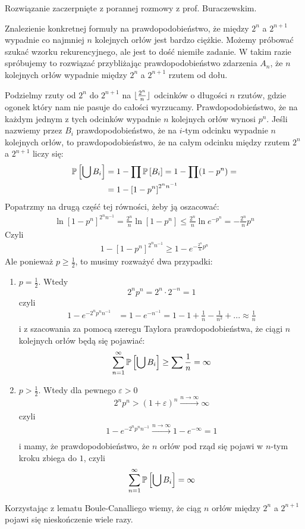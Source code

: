 \documentclass{article}
\begin{document}
Rozwiązanie zaczerpnięte z porannej rozmowy z prof. Buraczewskim.

Znalezienie konkretnej formuły na prawdopodobieństwo, że między $2^n$ a $2^{n+1}$ wypadnie co najmniej $n$ kolejnych orłów jest bardzo ciężkie. Możemy próbować szukać wzorku rekurencyjnego, ale jest to dość niemiłe zadanie. W takim razie spróbujemy to rozwiązać przybliżając prawdopodobieństwo zdarzenia $A_n$, że $n$ kolejnych orłów wypadnie między $2^n$ a $2^{n+1}$ rzutem od dołu.

Podzielmy rzuty od $2^n$ do $2^{n+1}$ na $\lfloor{2^n\over n}\rfloor$ odcinków o długości $n$ rzutów, gdzie ogonek który nam nie pasuje do całości wyrzucamy.
Prawdopodobieństwo, że na każdym jednym z tych odcinków wypadnie $n$ kolejnych orłów wynosi $p^n$. Jeśli nazwiemy przez $B_i$ prawdopodobieństwo, że na $i$-tym odcinku wypadnie $n$ kolejnych orłów, to prawdopodobieństwo, że na całym odcinku między rzutem $2^n$ a $2^{n+1}$ liczy się:
\begin{align*}
  \mathbb{P}\left[\bigcup B_i\right]&=1-\prod\mathbb{P}\left[B_i\right]=1-\prod(1-p^n)=\\
  &=1-\left[1-p^n\right]^{2^nn^{-1}}
\end{align*}
Popatrzmy na drugą część tej równości, żeby ją oszacować:
\begin{align*}
  \ln\left[1-p^n\right]^{2^nn^{-1}}=\frac{2^n}{n}\ln\left[1-p^n\right]\leq\frac{2^n}{n}\ln e^{-p^n}=-\frac{2^n}{n}p^n
\end{align*}
Czyli
\begin{align*}
  1-\left[1-p^n\right]^{2^nn^{-1}}\geq1-e^{-\frac{2^n}{n}p^n}
\end{align*}
Ale ponieważ $p\geq\frac12$, to musimy rozważyć dwa przypadki:
\begin{enumerate}
\item $p=\frac12$. Wtedy
$$2^np^n=2^n\cdot 2^{-n}=1$$
czyli
\begin{align*}
1-e^{-2^np^nn^{-1}}&= 1-e^{-n^{-1}}=1-1+\frac1n-\frac1{n^2}+...\approx\frac1n
\end{align*}
i z szacowania za pomocą szeregu Taylora prawdopodobieństwa, że ciągi $n$ kolejnych orłów będą się pojawiać:
$$\sum\limits_{n=1}^\infty\mathbb{P}\left[\bigcup B_i\right]\geq\sum\frac1n=\infty$$
\item $p>\frac12$. Wtedy dla pewnego $\varepsilon>0$
$$2^np^n>(1+\varepsilon)^n\xrightarrow[]{n\to\infty}\infty$$
czyli
\begin{align*}
1-e^{-2^np^nn^{-1}}\xrightarrow[]{n\to\infty}1-e^{-\infty}=1
\end{align*}
i mamy, że prawdopodobieństwo, że $n$ orłów pod rząd się pojawi w $n$-tym kroku zbiega do $1$, czyli
$$\sum\limits_{n=1}^\infty\mathbb{P}\left[\bigcup B_i\right]=\infty$$
\end{enumerate}
Korzystając z lematu Boule-Canalliego wiemy, że ciąg $n$ orłów między $2^n$ a $2^{n+1}$ pojawi się nieskończenie wiele razy. 
\end{document}
